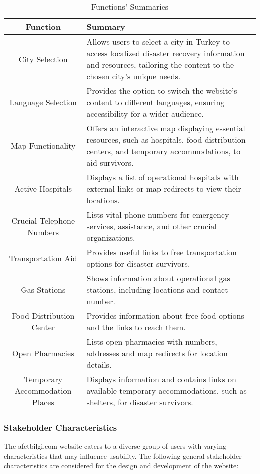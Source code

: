 \documentclass[11pt,a4paper]{article}
\begin{document}
\begin{table}[H]
    \centering
    \begin{tabular}{|c|p{9cm}|}
        \hline
        Function & Summary \\
        \hline
        City Selection & Allows users to select a city in Turkey to access localized disaster recovery information and resources, tailoring the content to the chosen city's unique needs. \\
        \hline
        Language Selection & Provides the option to switch the website's content to different languages, ensuring accessibility for a wider audience. \\
        \hline
        Map Functionality & Offers an interactive map displaying essential resources, such as hospitals, food distribution centers, and temporary accommodations, to aid survivors. \\
        \hline
        Active Hospitals & Displays a list of operational hospitals with external links or map redirects to view their locations. \\
        \hline
        Crucial Telephone Numbers &  Lists vital phone numbers for emergency services, assistance, and other crucial organizations. \\
        \hline
        Transportation Aid & Provides useful links to free transportation options for disaster survivors. \\
        \hline
        Gas Stations & Shows information about operational gas stations, including locations and contact number. \\
        \hline
        Food Distribution Center & Provides information about free food options and the links to reach them. \\
        \hline
        Open Pharmacies &  Lists open pharmacies with numbers, addresses and map redirects for location details. \\
        \hline
        Temporary Accommodation Places & Displays information and contains links on available temporary accommodations, such as shelters, for disaster survivors. \\
        \hline
    \end{tabular}
    \caption{Functions' Summaries}
    \label{Functions' Summaries}
\end{table}

\subsubsection{Stakeholder Characteristics}
The afetbilgi.com website caters to a diverse group of users with varying characteristics that may influence usability. The following general stakeholder characteristics are considered for the design and development of the website:
\end{document}
